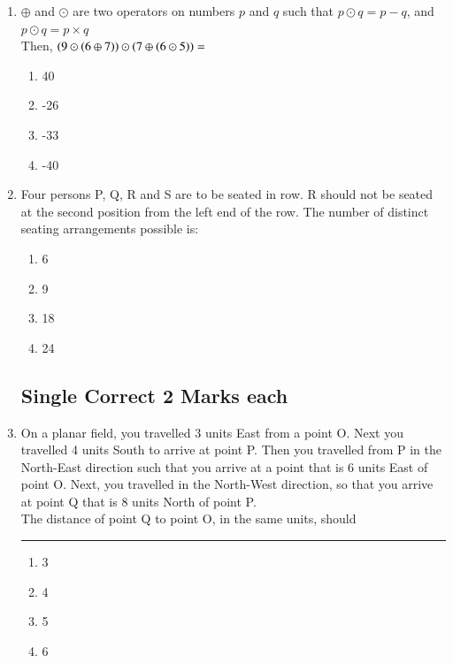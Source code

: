 \documentclass[journal]{IEEEtran}
\begin{document}
\begin{enumerate}
\item $\oplus$ and $\odot$ are two operators on numbers $p$ and $q$ such that $p \odot q = p - q$, and $p \odot q = p \times q$\\
Then, $\left(9 \odot \left(6 \oplus 7\right)\right) \odot \left(7 \oplus \left(6 \odot 5\right)\right) = $
\begin{multicols}{2}
    \begin{enumerate}
        \item 40
        \item -26
        \item -33
        \item -40
    \end{enumerate}
\end{multicols}

\item Four persons P, Q, R and S are to be seated in row. R should not be seated at the second position from the left end of the row. The number of distinct seating arrangements possible is:
\begin{multicols}{2}
    \begin{enumerate}
        \item 6
        \item 9
        \item 18
        \item 24
    \end{enumerate}
\end{multicols}

\subsection*{Single Correct 2 Marks each}
\item On a planar field, you travelled 3 units East from a point O. Next you travelled 4 units South to arrive at point P. Then you travelled from P in the North-East direction such that you arrive at a point that is 6 units East of point O. Next, you travelled in the North-West direction, so that you arrive at point Q that is 8 units North of point P.\\
The distance of point Q to point O, in the same units, should \rule{1cm}{0.15mm}
\begin{multicols}{2}
    \begin{enumerate}
        \item 3
        \item 4
        \item 5
        \item 6
    \end{enumerate}
\end{multicols}


\end{enumerate}
\end{document}
